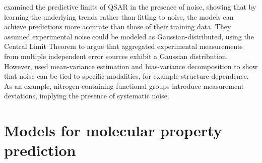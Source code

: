 \cite{Kolmar2021} examined the predictive limits of QSAR in the presence of noise, showing that by learning the underlying trends rather than fitting to noise, the models can achieve predictions more accurate than those of their training data. They assumed experimental noise could be modeled as Gaussian-distributed, using the Central Limit Theorem to argue that aggregated experimental measurements from multiple independent error sources exhibit a Gaussian distribution. However, \cite{Heid2023} used mean-variance estimation and bias-variance decomposition to show that noise can be tied to specific modalities, for example structure dependence. As an example, nitrogen-containing functional groups introduce measurement deviations, implying the presence of systematic noise. 

\section{Models for molecular property prediction}
